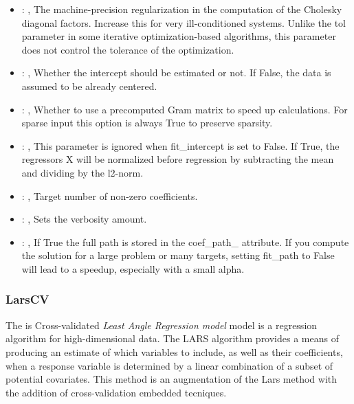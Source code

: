 \begin{itemize}
    \item {}: , 
      The machine-precision regularization in the computation of the Cholesky
      diagonal factors. Increase this for very ill-conditioned systems. Unlike the tol
      parameter in some iterative optimization-based algorithms, this parameter does not
      control the tolerance of the optimization.

    \item {}: , 
      Whether the intercept should be estimated or not. If False,
      the data is assumed to be already centered.

    \item {}: , 
      Whether to use a precomputed Gram matrix to speed up calculations.
      For sparse input this option is always True to preserve sparsity.

    \item {}: , 
      This parameter is ignored when fit\_intercept is set to False. If True,
      the regressors X will be normalized before regression by subtracting the mean and
      dividing by the l2-norm.

    \item {}: , 
      Target number of non-zero coefficients.

    \item {}: , 
      Sets the verbosity amount.

    \item {}: , 
      If True the full path is stored in the coef\_path\_ attribute.
      If you compute the solution for a large problem or many targets,
      setting fit\_path to False will lead to a speedup, especially with a
      small alpha.
  \end{itemize}


\subsubsection{LarsCV}
  The  is Cross-validated \textit{Least Angle Regression model} model
  is a regression algorithm for high-dimensional data.                         The LARS algorithm
  provides a means of producing an estimate of which variables                         to include,
  as well as their coefficients, when a response variable is                         determined by a
  linear combination of a subset of potential covariates.                         This method is an
  augmentation of the Lars method with the addition of cross-validation
  embedded tecniques.                         

